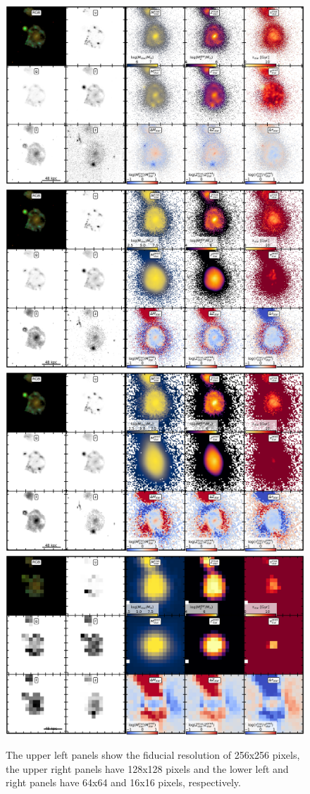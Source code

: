 \documentclass[conference]{IEEEtran}
\begin{document}
\begin{figure}
\vspace{-.25cm}
\begin{center}
\includegraphics[width=.49\textwidth]{./plots/2096_masked.pdf}
\includegraphics[width=.49\textwidth]{./plots/2096_masked_2.pdf}
\includegraphics[width=.49\textwidth]{./plots/2096_masked_4.pdf}
\includegraphics[width=.49\textwidth]{./plots/2096_masked_16.pdf}
\end{center}
\vspace{-.35cm}
\caption{ The upper left panels show the fiducial resolution of 256x256 pixels, the upper right panels have 128x128 pixels and the lower left and right panels have 64x64 and 16x16 pixels, respectively.
}
\label{fig:app_res_comp}
\end{figure}
\end{document}

